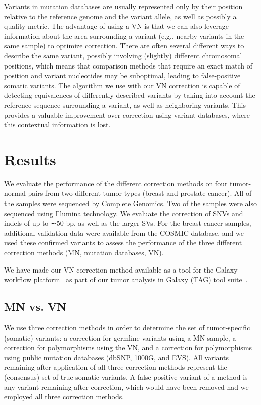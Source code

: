 Variants in mutation databases are usually represented only by their position relative to the reference genome and the variant allele, as well as possibly a quality metric. The advantage of using a VN is that we can also leverage information about the area surrounding a variant (e.g., nearby variants in the same sample) to optimize correction. There are often several different ways to describe the same variant, possibly involving (slightly) different chromosomal positions, which means that comparison methods that require an exact match of position and variant nucleotides may be suboptimal, leading to false-positive somatic variants. The algorithm we use with our VN correction is capable of detecting equivalences of differently described variants by taking into account the reference sequence surrounding a variant, as well as neighboring variants. This provides a valuable improvement over correction using variant databases, where this contextual information is lost.

\section*{Results}

We evaluate the performance of the different correction methods on four tumor-normal pairs from two different tumor types (breast and prostate cancer). All of the samples were sequenced by Complete Genomics. Two of the samples were also sequenced using Illumina technology. We evaluate the correction of SNVs and indels of up to ∼50 bp, as well as the larger SVs. For the breast cancer samples, additional validation data were available from the COSMIC database, and we used these confirmed variants to assess the performance of the three different correction methods (MN, mutation databases, VN).

We have made our VN correction method available as a tool for the Galaxy workflow platform~\cite{giardine2005galaxy,blankenberg2010galaxy2,goecks2010galaxy} as part of our tumor analysis in Galaxy (TAG) tool suite~\cite{hiltemann2014cgtag}.

\subsection*{MN vs. VN}

We use three correction methods in order to determine the set of tumor-specific (somatic) variants: a correction for germline variants using a MN sample, a correction for polymorphisms using the VN, and a correction for polymorphisms using public mutation databases (dbSNP, 1000G, and EVS). All variants remaining after application of all three correction methods represent the (consensus) set of true somatic variants. A false-positive variant of a method is any variant remaining after correction, which would have been removed had we employed all three correction methods.

